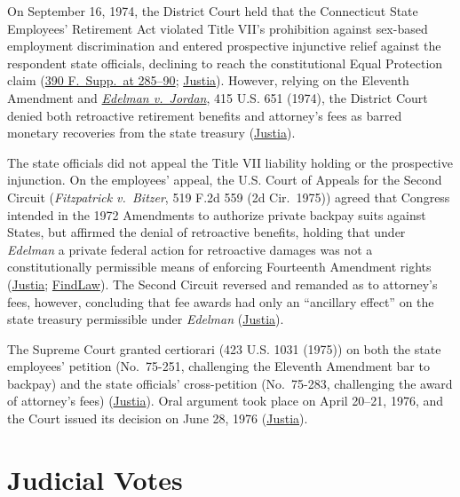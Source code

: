 \documentclass[12pt]{article}
\begin{document}
On September 16, 1974, the District Court held that the Connecticut State Employees' Retirement Act violated Title VII's prohibition against sex-based employment discrimination and entered prospective injunctive relief against the respondent state officials, declining to reach the constitutional Equal Protection claim (\href{https://law.justia.com/cases/federal/district-courts/FSupp/390/278/1966559/}{390 F.\ Supp.\ at 285--90}; \href{https://supreme.justia.com/cases/federal/us/427/445/}{Justia}). However, relying on the Eleventh Amendment and \href{https://supreme.justia.com/cases/federal/us/415/651/}{\textit{Edelman v.\ Jordan}}, 415 U.S. 651 (1974), the District Court denied both retroactive retirement benefits and attorney's fees as barred monetary recoveries from the state treasury (\href{https://supreme.justia.com/cases/federal/us/427/445/}{Justia}).

The state officials did not appeal the Title VII liability holding or the prospective injunction. On the employees' appeal, the U.S. Court of Appeals for the Second Circuit (\textit{Fitzpatrick v.\ Bitzer}, 519 F.2d 559 (2d Cir.\ 1975)) agreed that Congress intended in the 1972 Amendments to authorize private backpay suits against States, but affirmed the denial of retroactive benefits, holding that under \textit{Edelman} a private federal action for retroactive damages was not a constitutionally permissible means of enforcing Fourteenth Amendment rights (\href{https://supreme.justia.com/cases/federal/us/427/445/}{Justia}; \href{https://caselaw.findlaw.com/court/us-supreme-court/427/445.html}{FindLaw}). The Second Circuit reversed and remanded as to attorney's fees, however, concluding that fee awards had only an ``ancillary effect'' on the state treasury permissible under \textit{Edelman} (\href{https://supreme.justia.com/cases/federal/us/427/445/}{Justia}).

The Supreme Court granted certiorari (423 U.S. 1031 (1975)) on both the state employees' petition (No.\ 75-251, challenging the Eleventh Amendment bar to backpay) and the state officials' cross-petition (No.\ 75-283, challenging the award of attorney's fees) (\href{https://supreme.justia.com/cases/federal/us/427/445/}{Justia}). Oral argument took place on April 20--21, 1976, and the Court issued its decision on June 28, 1976 (\href{https://supreme.justia.com/cases/federal/us/427/445/}{Justia}).

\section{Judicial Votes}
\end{document}
